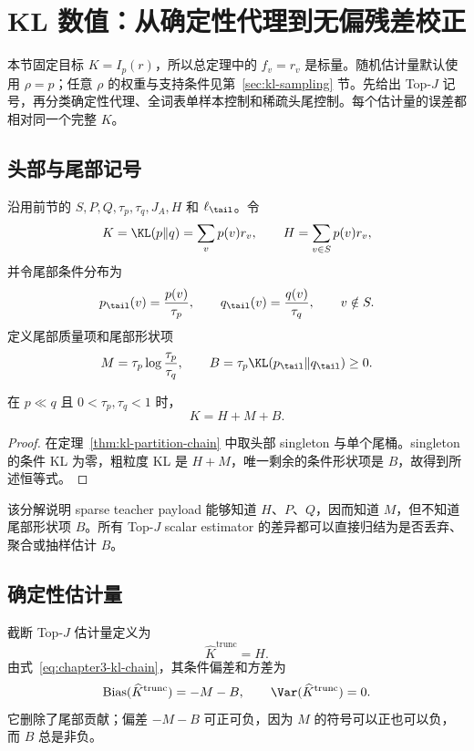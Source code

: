 \section{KL 数值：从确定性代理到无偏残差校正}
\label{sec:kl-scalar}
本节固定目标 $K=I_p(r)$，所以总定理中的 $f_v=r_v$ 是标量。随机估计量默认使用 $\rho=p$；任意 $\rho$ 的权重与支持条件见第~\ref{sec:kl-sampling} 节。先给出 Top-$J$ 记号，再分类确定性代理、全词表单样本控制和稀疏头尾控制。每个估计量的误差都相对同一个完整 $K$。
\subsection{头部与尾部记号}

沿用前节的 $S,P,Q,\tau_p,\tau_q,J_A,H$ 和 $\ell_{\tail}$。令
\[
 K=\KL(p\Vert q)=\sum_vp(v)r_v,
 \qquad H=\sum_{v\in S}p(v)r_v,
 \]
并令尾部条件分布为
\[
 p_\tail(v)=\frac{p(v)}{\tau_p},\qquad
 q_\tail(v)=\frac{q(v)}{\tau_q},\qquad v\notin S.
\]
定义尾部质量项和尾部形状项
\[
 M=\tau_p\log\frac{\tau_p}{\tau_q},\qquad
 B=\tau_p\KL(p_\tail\Vert q_\tail)\geq0.
\]

\begin{corollary}
\label{thm:chapter3-kl-chain}
在 $p\ll q$ 且 $0<\tau_p,\tau_q<1$ 时，
\begin{equation}
 K=H+M+B.
\label{eq:chapter3-kl-chain}
\end{equation}
\end{corollary}

\begin{proof}
在定理~\ref{thm:kl-partition-chain} 中取头部 singleton 与单个尾桶。singleton 的条件 KL 为零，粗粒度 KL 是 $H+M$，唯一剩余的条件形状项是 $B$，故得到所述恒等式。
\end{proof}

该分解说明 sparse teacher payload 能够知道 $H$、$P$、$Q$，因而知道 $M$，但不知道尾部形状项 $B$。所有 Top-$J$ scalar estimator 的差异都可以直接归结为是否丢弃、聚合或抽样估计 $B$。

\subsection{确定性估计量}

截断 Top-$J$ 估计量定义为
\[
 \widehat K^{\mathrm{trunc}}=H.
\]
由式~\eqref{eq:chapter3-kl-chain}，其条件偏差和方差为
\begin{equation}
 \operatorname{Bias}(\widehat K^{\mathrm{trunc}})=-M-B,
 \qquad
 \Var(\widehat K^{\mathrm{trunc}})=0.
 \label{eq:chapter3-trunc-bias-var}
\end{equation}
它删除了尾部贡献；偏差 $-M-B$ 可正可负，因为 $M$ 的符号可以正也可以负，而 $B$ 总是非负。

